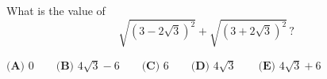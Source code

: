What is the value of
\[\sqrt{\left(3-2\sqrt3\right)^2}+\sqrt{\left(3+2\sqrt3\right)^2}\,?\]

$\textbf{(A) }0\qquad\textbf{(B) }4\sqrt3-6\qquad\textbf{(C) }6\qquad\textbf{(D) }4\sqrt3\qquad\textbf{(E) }4\sqrt3+6$
